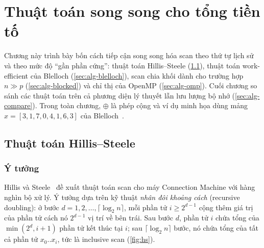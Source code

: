\chapter{Thuật toán song song cho tổng tiền tố}
\label{ch:algorithms}

Chương này trình bày bốn cách tiếp cận song song hóa scan theo thứ tự lịch sử và theo mức độ
``gần phần cứng'': thuật toán Hillis--Steele (\cref{sec:alg-hs}), thuật toán work-efficient của
Blelloch (\cref{sec:alg-blelloch}), scan chia khối dành cho trường hợp \(n \gg p\)
(\cref{sec:alg-blocked}) và chỉ thị  của OpenMP (\cref{sec:alg-omp}). Cuối chương
so sánh các thuật toán trên cả phương diện lý thuyết lẫn lưu lượng bộ nhớ
(\cref{sec:alg-compare}). Trong toàn chương, \(\oplus\) là phép cộng và ví dụ minh họa dùng mảng
\(x = [3, 1, 7, 0, 4, 1, 6, 3]\) của Blelloch~\cite{blelloch1990}.

\newcommand{\drawrow}[4]{%
  \foreach \h in {#4} {\expandafter\gdef\csname hlx\h\endcsname{}}%
  \node[lbl] at (-0.6,#1) {#2};
  \foreach \v [count=\i from 0] in {#3} {
    \ifcsname hlx\i\endcsname
      \node[hl] (r#1c\i) at (\i*1.05,#1) {\v};
    \else
      \node[cell] (r#1c\i) at (\i*1.05,#1) {\v};
    \fi
  }%
  \foreach \h in {#4} {\global\expandafter\let\csname hlx\h\endcsname\undefined}%
}

\section{Thuật toán Hillis--Steele}
\label{sec:alg-hs}

\subsection{Ý tưởng}

Hillis và Steele~\cite{hillis1986} đề xuất thuật toán scan cho máy Connection Machine với hàng
nghìn bộ xử lý. Ý tưởng dựa trên kỹ thuật \emph{nhân đôi khoảng cách} (recursive doubling): ở
bước \(d = 1, 2, \ldots, \lceil\log_2 n\rceil\), mỗi phần tử \(i \ge 2^{d-1}\) cộng thêm giá trị
của phần tử cách nó \(2^{d-1}\) vị trí về bên trái. Sau bước \(d\), phần tử \(i\) chứa tổng của
\(\min(2^d, i+1)\) phần tử kết thúc tại \(i\); sau \(\lceil\log_2 n\rceil\) bước, nó chứa tổng của
tất cả phần tử \(x_0..x_i\), tức là inclusive scan (\cref{fig:hs}).

